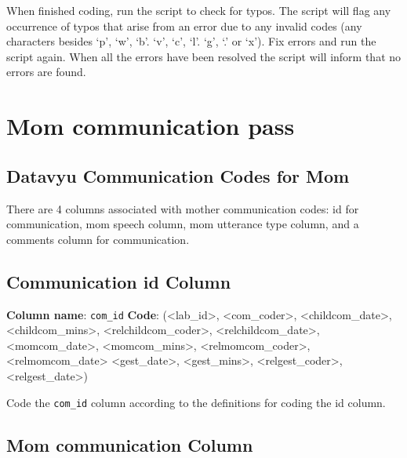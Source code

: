 \documentclass[
]{book}
\begin{document}
When finished coding, run the script to check for typos. The script will flag any occurrence of typos that arise from an error due to any invalid codes (any characters besides `p', `w', `b'. `v', `c', `l'. `g', `.' or `x'). Fix errors and run the script again. When all the errors have been resolved the script will inform that no errors are found.

\hypertarget{mom-communication-pass}{%
\section{Mom communication pass}\label{mom-communication-pass}}

\hypertarget{datavyu-communication-codes-for-mom}{%
\subsection*{Datavyu Communication Codes for Mom}\label{datavyu-communication-codes-for-mom}}

There are 4 columns associated with mother communication codes: id for communication, mom speech column, mom utterance type column, and a comments column for communication.

\hypertarget{communication-id-column}{%
\subsection*{Communication id Column}\label{communication-id-column}}

\textbf{Column name}: \texttt{com\_id}
\textbf{Code}: (\textless lab\_id\textgreater, \textless com\_coder\textgreater, \textless childcom\_date\textgreater, \textless childcom\_mins\textgreater, \textless relchildcom\_coder\textgreater, \textless relchildcom\_date\textgreater, \textless momcom\_date\textgreater, \textless momcom\_mins\textgreater, \textless relmomcom\_coder\textgreater, \textless relmomcom\_date\textgreater{} \textless gest\_date\textgreater, \textless gest\_mins\textgreater, \textless relgest\_coder\textgreater, \textless relgest\_date\textgreater)

Code the \texttt{com\_id} column according to the definitions for coding the id column.

\hypertarget{mom-communication-column}{%
\subsection*{Mom communication Column}\label{mom-communication-column}}
\end{document}
